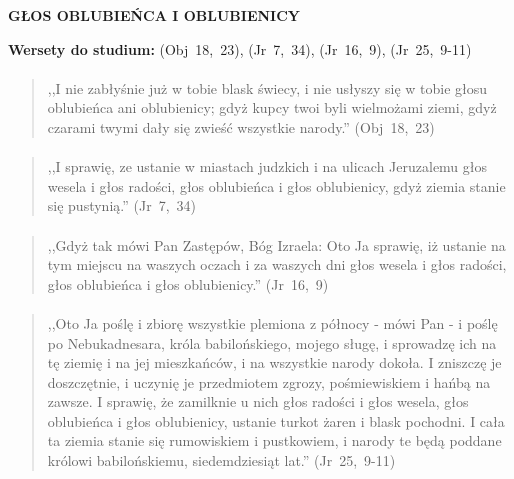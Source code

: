 \documentclass[10pt,a4paper,oneside]{article}
\begin{document}
\centerline{\textbf{\MakeUppercase{Głos Oblubieńca i Oblubienicy}}}
\begin{center}
\textbf{Wersety do studium:} 
\mbox{(Obj 18, 23)}, \mbox{(Jr 7, 34)}, \mbox{(Jr 16, 9)}, \mbox{(Jr 25, 9-11)}
\end{center}
\paragraph{}
\begin{quote}
,,I nie zabłyśnie już w tobie blask świecy, i nie usłyszy się w tobie głosu oblubieńca ani oblubienicy; gdyż kupcy twoi byli wielmożami ziemi, gdyż czarami twymi dały się zwieść wszystkie narody.'' \mbox{(Obj 18, 23)}
\end{quote}
\paragraph{}
\begin{quote}
,,I sprawię, ze ustanie w miastach judzkich i na ulicach Jeruzalemu głos wesela i głos radości, głos oblubieńca i głos oblubienicy, gdyż ziemia stanie się pustynią.'' \mbox{(Jr 7, 34)}
\end{quote}
\paragraph{}
\begin{quote}
,,Gdyż tak mówi Pan Zastępów, Bóg Izraela: Oto Ja sprawię, iż ustanie na tym miejscu na waszych oczach i za waszych dni głos wesela i głos radości, głos oblubieńca i głos oblubienicy.'' \mbox{(Jr 16, 9)}
\end{quote}
\paragraph{}
\begin{quote}
,,Oto Ja poślę i zbiorę wszystkie plemiona z północy - mówi Pan - i poślę po Nebukadnesara, króla babilońskiego, mojego sługę, i sprowadzę ich na tę ziemię i na jej mieszkańców, i na wszystkie narody dokoła. I zniszczę je doszczętnie, i uczynię je przedmiotem zgrozy, pośmiewiskiem i hańbą na zawsze. I sprawię, że zamilknie u nich głos radości i głos wesela, głos oblubieńca i głos oblubienicy, ustanie turkot żaren i blask pochodni. I cała ta ziemia stanie się rumowiskiem i pustkowiem, i narody te będą poddane królowi babilońskiemu, siedemdziesiąt lat.'' \mbox{(Jr 25, 9-11)}
\end{quote}
\end{document}
